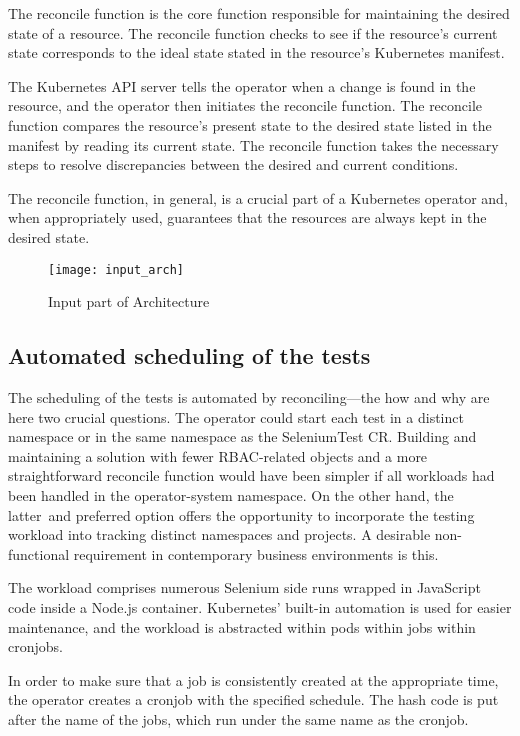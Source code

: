 The reconcile function is the core function responsible for maintaining the desired state of a resource. The reconcile function checks to see if the resource's current state corresponds to the ideal state stated in the resource's Kubernetes manifest.

The Kubernetes API server tells the operator when a change is found in the resource, and the operator then initiates the reconcile function. The reconcile function compares the resource's present state to the desired state listed in the manifest by reading its current state. The reconcile function takes the necessary steps to resolve discrepancies between the desired and current conditions.

The reconcile function, in general, is a crucial part of a Kubernetes operator and, when appropriately used, guarantees that the resources are always kept in the desired state.

\begin{figure}[H]
	\centering
	\texttt{[image: input\_arch]}
	\label{fig:input_arch}
	\caption{Input part of Architecture}
\end{figure}

\subsection{Automated scheduling of the tests}

The scheduling of the tests is automated by reconciling—the how and why are here two crucial questions. The operator could start each test in a distinct namespace or in the same namespace as the SeleniumTest CR. Building and maintaining a solution with fewer RBAC-related objects and a more straightforward reconcile function would have been simpler if all workloads had been handled in the operator-system namespace. On the other hand, the latter and preferred option offers the opportunity to incorporate the testing workload into tracking distinct namespaces and projects. A desirable non-functional requirement in contemporary business environments is this.

The workload comprises numerous Selenium side runs wrapped in JavaScript code inside a Node.js container. Kubernetes' built-in automation is used for easier maintenance, and the workload is abstracted within pods within jobs within cronjobs.

In order to make sure that a job is consistently created at the appropriate time, the operator creates a cronjob with the specified schedule. The hash code is put after the name of the jobs, which run under the same name as the cronjob.

